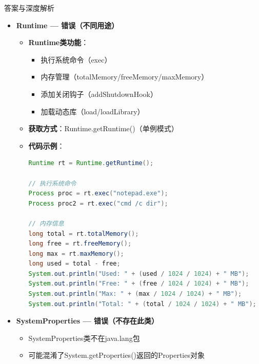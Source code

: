 \documentclass[12pt, a4paper]{ctexart}
\begin{document}
\begin{enumerate}[label=\textbf{\arabic*.}]
\begin{bluebox}{答案与深度解析}
\begin{itemize}[leftmargin=*, nosep, label={}]
\begin{itemize}[label={}, leftmargin=*, nosep]
\begin{lstlisting}[language=Java]
// config.properties文件内容：
# Database Configuration
# Thu Mar 05 10:30:00 CST 2026
database.password=password123
database.url=jdbc:mysql\://localhost\:3306/mydb
database.user=admin

// 从文件加载
Properties props2 = new Properties();
try (InputStream in = new FileInputStream("config.properties")) {
    props2.load(in);
}
String url = props2.getProperty("database.url");
				            \end{lstlisting}
			            \end{itemize}

			      \item[C] \textbf{Runtime — 错误（不同用途）}
			            \begin{itemize}[label={}, leftmargin=*, nosep]
				            \item \textbf{Runtime类功能}：
				                  \begin{itemize}[label={}, nosep]
					                  \item 执行系统命令（exec）
					                  \item 内存管理（totalMemory/freeMemory/maxMemory）
					                  \item 添加关闭钩子（addShutdownHook）
					                  \item 加载动态库（load/loadLibrary）
				                  \end{itemize}
				            \item \textbf{获取方式}：Runtime.getRuntime()（单例模式）
				            \item \textbf{代码示例}：
				                  \begin{lstlisting}[language=Java]
Runtime rt = Runtime.getRuntime();

// 执行系统命令
Process proc = rt.exec("notepad.exe");
Process proc2 = rt.exec("cmd /c dir");

// 内存信息
long total = rt.totalMemory();
long free = rt.freeMemory();
long max = rt.maxMemory();
long used = total - free;
System.out.println("Used: " + (used / 1024 / 1024) + " MB");
System.out.println("Free: " + (free / 1024 / 1024) + " MB");
System.out.println("Max: " + (max / 1024 / 1024) + " MB");
System.out.println("Total: " + (total / 1024 / 1024) + " MB");
				            \end{lstlisting}
			            \end{itemize}

			      \item[D] \textbf{SystemProperties — 错误（不存在此类）}
			            \begin{itemize}[label={}, leftmargin=*, nosep]
				            \item SystemProperties类不在java.lang包
				            \item 可能混淆了System.getProperties()返回的Properties对象
			            \end{itemize}
		      \end{itemize}


\end{bluebox}
\end{enumerate}
\end{document}
